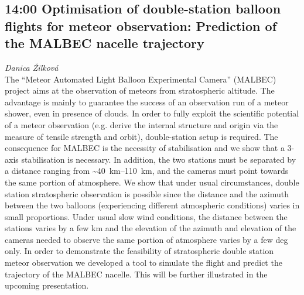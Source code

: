 \documentclass[a4paper]{report}
\begin{document}
                                                \begin{tcolorbox}
                            \subsection{14:00 \hfill Optimisation of double-station balloon flights for meteor observation: Prediction of the MALBEC nacelle trajectory}
                                    \hfill \textit{Danica Žilková} \\
                                                    The “Meteor Automated Light Balloon Experimental Camera” (MALBEC) project aims at the observation of meteors from stratospheric altitude. The advantage is mainly to guarantee the success of an observation run of a meteor shower, even in presence of clouds. In order to fully exploit the scientific potential of a meteor observation (e.g. derive the internal structure and origin via the measure of tensile strength and orbit), double-station setup is required. The consequence for MALBEC is the necessity of stabilisation and we show that a 3-axis stabilisation is necessary. In addition, the two stations must be separated by a distance ranging from \textasciitilde\SIrange{40}{110}{\kilo\metre}, and the cameras must point towards the same portion of atmosphere. We show that under usual circumstances, double station stratospheric observation is possible since the distance and the azimuth between the two balloons (experiencing different atmospheric conditions) varies in small proportions. Under usual slow wind conditions, the distance between the stations varies by a few km and the elevation of the azimuth and elevation of the cameras needed to observe the same portion of atmosphere varies by a few deg only. In order to demonstrate the feasibility of stratospheric double station meteor observation we developed a tool to simulate the flight and predict the trajectory of the MALBEC nacelle. This will be further illustrated in the upcoming presentation.

                                            \end{tcolorbox}
                                \section{\color[rgb]{0, 0.1, 0.4}{sobota}}
\end{document}
